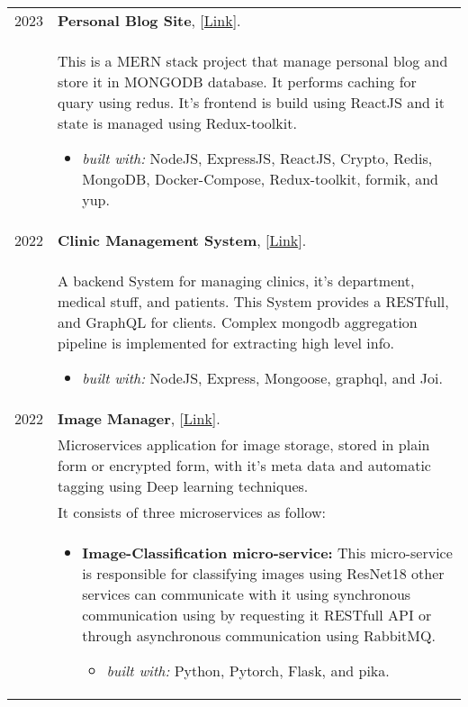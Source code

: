 \documentclass[a4paper,10pt]{article}
\begin{document}
    \begin{longtable}{r p{16cm}}
        2023  & \textbf{Personal Blog Site}, [\href{https://github.com/zaky-fetoh/Personal-Blog-Site}{Link}].\\&
        This is a MERN stack project that manage personal blog and store it in MONGODB database. It performs caching for quary using redus. It's frontend is build using ReactJS and it state is managed using Redux-toolkit.
        \begin{itemize}
            \item \textit{built with: } NodeJS, ExpressJS,  ReactJS, Crypto, Redis, MongoDB, Docker-Compose, Redux-toolkit, formik, and yup.
        \end{itemize}\\

        2022  & \textbf{Clinic Management System}, [\href{https://github.com/zaky-fetoh/Clinic-Management-System}{Link}].\\&
        A backend System for managing clinics, it's department, medical stuff, and patients. This 	System provides a RESTfull, and GraphQL for clients. Complex mongodb aggregation pipeline 	is implemented for extracting high level info.
        \begin{itemize}
            \item \textit{built with: } NodeJS, Express, Mongoose, graphql, and Joi. 
        \end{itemize}\\


        2022  & \textbf{Image Manager}, [\href{https://github.com/zaky-fetoh/image-maneger-microservices-app}{Link}].  \\& Microservices application for image storage, stored in plain form or encrypted form, with it's meta data and automatic tagging using Deep learning techniques. \\&
        It consists of three microservices as follow:\\&
        \begin{itemize}
            \item \textbf{Image-Classification micro-service:}
            This micro-service is responsible for classifying images using ResNet18 other services can communicate with it using synchronous communication using by 
            requesting it RESTfull API or through asynchronous communication using RabbitMQ.
            \begin{itemize}
                \item \textit{built with: } Python, Pytorch, Flask, and pika.
            \end{itemize}


\end{itemize}
\end{longtable}
\end{document}
